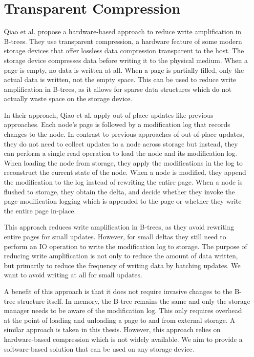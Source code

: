 
\section{Transparent Compression}
\label{sec:related-work-compression}
Qiao et al. \cite{qiao2022compression} propose a hardware-based approach to reduce write amplification in B-trees.
They use transparent compression, a hardware feature of some modern storage devices that offer lossless data compression transparent to the host.
The storage device compresses data before writing it to the physical medium.
When a page is empty, no data is written at all.
When a page is partially filled, only the actual data is written, not the empty space.
This can be used to reduce write amplification in B-trees, as it allows for sparse data structures which do not actually waste space on the storage device.

In their approach, Qiao et al. apply out-of-place updates like previous approaches.
Each node's page is followed by a modification log that records changes to the node.
In contrast to previous approaches of out-of-place updates, they do not need to collect updates to a node across storage but instead, they can perform a single read operation to load the node and its modification log.
When loading the node from storage, they apply the modifications in the log to reconstruct the current state of the node.
When a node is modified, they append the modification to the log instead of rewriting the entire page.
When a node is flushed to storage, they obtain the delta, and decide whether they invoke the page modification logging which is appended to the page or whether they write the entire page in-place.

This approach reduces write amplification in B-trees, as they avoid rewriting entire pages for small updates.
However, for small deltas they still need to perform an \ac{IO} operation to write the modification log to storage.
The purpose of reducing write amplification is not only to reduce the amount of data written, but primarily to reduce the frequency of writing data by batching updates.
We want to avoid writing at all for small updates.

A benefit of this approach is that it does not require invasive changes to the B-tree structure itself.
In memory, the B-tree remains the same and only the storage manager needs to be aware of the modification log.
This only requires overhead at the point of loading and unloading a page to and from external storage.
A similar approach is taken in this thesis.
However, this approach relies on hardware-based compression which is not widely available.
We aim to provide a software-based solution that can be used on any storage device.

